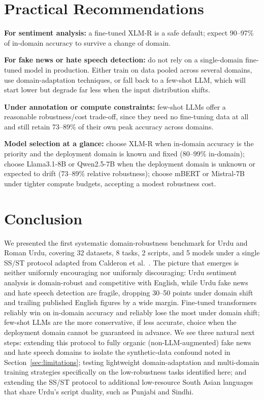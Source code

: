 \documentclass[10pt,twocolumn,journal]{IEEEtran}
\begin{document}
\section{Practical Recommendations}

\textbf{For sentiment analysis:} a fine-tuned XLM-R is a safe default; expect 90--97\% of in-domain accuracy to survive a change of domain.

\textbf{For fake news or hate speech detection:} do not rely on a single-domain fine-tuned model in production. Either train on data pooled across several domains, use domain-adaptation techniques, or fall back to a few-shot LLM, which will start lower but degrade far less when the input distribution shifts.

\textbf{Under annotation or compute constraints:} few-shot LLMs offer a reasonable robustness/cost trade-off, since they need no fine-tuning data at all and still retain 73--89\% of their own peak accuracy across domains.

\textbf{Model selection at a glance:} choose XLM-R when in-domain accuracy is the priority and the deployment domain is known and fixed (80--99\% in-domain); choose Llama3.1-8B or Qwen2.5-7B when the deployment domain is unknown or expected to drift (73--89\% relative robustness); choose mBERT or Mistral-7B under tighter compute budgets, accepting a modest robustness cost.

\section{Conclusion}

We presented the first systematic domain-robustness benchmark for Urdu and Roman Urdu, covering 32 datasets, 8 tasks, 2 scripts, and 5 models under a single SS/ST protocol adapted from Calderon et al.~\cite{calderon2024measuring}. The picture that emerges is neither uniformly encouraging nor uniformly discouraging: Urdu sentiment analysis is domain-robust and competitive with English, while Urdu fake news and hate speech detection are fragile, dropping 30--50 points under domain shift and trailing published English figures by a wide margin. Fine-tuned transformers reliably win on in-domain accuracy and reliably lose the most under domain shift; few-shot LLMs are the more conservative, if less accurate, choice when the deployment domain cannot be guaranteed in advance. We see three natural next steps: extending this protocol to fully organic (non-LLM-augmented) fake news and hate speech domains to isolate the synthetic-data confound noted in Section~\ref{sec:limitations}; testing lightweight domain-adaptation and multi-domain training strategies specifically on the low-robustness tasks identified here; and extending the SS/ST protocol to additional low-resource South Asian languages that share Urdu's script duality, such as Punjabi and Sindhi.
\end{document}
